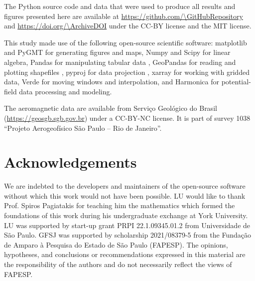 The Python source code and data that were used to produce all results and
figures presented here are available at
\url{https://github.com/\GitHubRepository}
and \url{https://doi.org/\ArchiveDOI} \citep{figshare}
under the CC-BY license and the MIT license.

This study made use of the following open-source scientific software:
matplotlib \citep{matplotlib} and PyGMT \citep{pygmt} for generating figures
and maps,
Numpy \citep{numpy} and Scipy \citep{scipy} for linear algebra,
Pandas for manipulating tabular data \citep{McKinney2010,pandas},
GeoPandas for reading and plotting shapefiles \citep{geopandas},
pyproj for data projection \citep{pyproj},
xarray \citep{xarray} for working with gridded data,
Verde \citep{verde} for moving windows and interpolation,
and
Harmonica \citep{harmonica} for potential-field data processing and modeling.

The aeromagnetic data are available from Serviço Geológico do Brasil
(\url{https://geosgb.sgb.gov.br}) under a CC-BY-NC license. It is part of
survey 1038 ``Projeto Aerogeofísico São Paulo -- Rio de Janeiro''.



\section*{Acknowledgements}

We are indebted to the developers and maintainers of the open-source software
without which this work would not have been possible.
LU would like to thank Prof. Spiros Pagiatakis for teaching him the mathematics which formed the foundations of this work during his undergraduate exchange at York University.
LU was supported by start-up grant PRPI 22.1.09345.01.2 from Universidade de São Paulo.
GFSJ was supported by scholarship 2021/08379-5 from the Fundação de Amparo à Pesquisa do Estado de São Paulo (FAPESP).
The opinions, hypotheses, and conclusions or recommendations expressed in this material are the responsibility of the authors and do not necessarily reflect the views of FAPESP.

